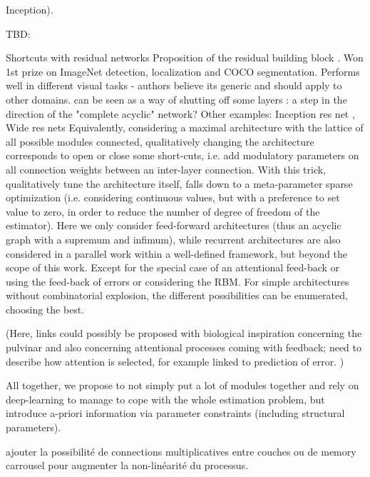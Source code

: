 \documentclass[twocolumn]{article}
\begin{document}
Inception\cite{Szegedy2014Going,Szegedy2016Inception,Szegedy2016Rethinking}).



TBD:
\begin{outline}
\1 Shortcuts with residual networks
	\2 Proposition of the residual building block \cite{He2016Deep}. Won 1st prize on ImageNet detection, localization and COCO segmentation. Performs well in different visual tasks - authors believe its generic and should apply to other domains.
    \2 can be seen as a way of shutting off some layers : a step in the direction of the "complete acyclic" network?
	\2 Other examples: Inception res net \cite{Szegedy2016Inception}, Wide res nets\cite{Zagoruyko2016Wide}
   \1 Equivalently, considering a maximal architecture with the lattice of all possible modules connected, qualitatively changing the architecture corresponds to open or close some short-cuts, i.e. add modulatory parameters on all connection weights between an inter-layer connection. With this trick, qualitatively tune the architecture itself, falls down to a meta-parameter sparse optimization (i.e. considering continuous values, but with a preference to set value to zero, in order to reduce the number of degree of freedom of the estimator). 
Here we only consider feed-forward architectures (thus an acyclic graph with a supremum and infimum), while recurrent architectures are also considered in a parallel work within a well-defined framework, but beyond the scope of this work. Except for the special case of an attentional feed-back or using the feed-back of errors or considering the RBM. 
\1 For simple architectures without combinatorial explosion, the different possibilities can be enumerated, choosing the best. 

\1 (Here, links could possibly be proposed with biological inspiration concerning the pulvinar and also concerning attentional processes coming with feedback; need to describe how attention is selected, for example linked to prediction of error. )

\1 All together, we propose to not simply put a lot of modules together and rely on deep-learning to manage to cope with the whole estimation problem, but introduce a-priori information via parameter constraints (including structural parameters).

\1  ajouter la possibilité de connections multiplicatives entre couches ou de memory carrousel pour augmenter la non-linéarité du processus.

\end{outline}


\end{document}
